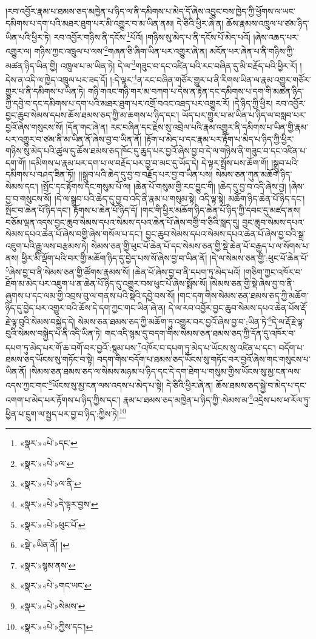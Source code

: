 །རབ་འབྱོར་རྣམ་པ་ཐམས་ཅད་མཁྱེན་པ་ཉིད་ལ་ནི་དམིགས་པ་མེད་དོ་ཞེས་འབྱུང་བས་ཁྱེད་ཀྱི་ཕྱོགས་ལ་ཡང་དམིགས་པ་དག་པའི་མཐར་ཐུག་པར་མི་འགྱུར་བ་མ་ཡིན་ནམ། དེ་ཅིའི་ཕྱིར་ཞེ་ན། ཆོས་རྣམས་འཁྲུལ་པ་ཙམ་ཉིད་ཡིན་པའི་ཕྱིར་ཏེ། རབ་འབྱོར་གཉིས་ནི་དངོས་\footnote{«སྣར་»«པེ་»དང་}པོའོ། །གཉིས་སུ་མེད་པ་ནི་དངོས་པོ་མེད་པའོ། །ཞེས་འཆད་པར་འགྱུར་ལ། གཉིས་ཀྱང་འཁྲུལ་པ་ལས་\footnote{«སྣར་»«པེ་»ལ་}གཞན་ཅི་ཞིག་ཡིན་པར་འགྱུར་ཞེ་ན། མངོན་པར་ཞེན་པ་ནི་གཉིས་ཀྱི་མཚན་ཉིད་ཡིན་གྱི། འཁྲུལ་པ་མ་ཡིན་ཏེ། དེ་ལ་\footnote{«སྣར་»«པེ་»ལ་ནི་}གཟུང་བ་དང་འཛིན་པའི་རང་བཞིན་དུ་མི་བརྗོད་པའི་ཕྱིར་རོ། །དེས་ན་འདི་ལ་ཁྱེད་འཁྲུལ་པར་ཟད་དོ། །:དེ་ལྟར་\footnote{«སྣར་»«པེ་»དེ་ལྟར་བྱས་}ན་རང་བཞིན་གཙོར་གྱུར་པ་ནི་རིགས་ཡིན་ལ་རྣམ་འགྱུར་གཙོར་གྱུར་པ་ནི་དམིགས་པ་ཡིན་ཏེ། གཉི་གའང་གཉི་གར་མ་བཀག་པ་དེས་ན་རྟེན་དང་དམིགས་པ་དག་གི་མཚན་ཉིད་ཀྱི་དབྱེ་བ་དང་དམིགས་པ་དག་པའི་མཐར་ཐུག་པར་འགྲོ་བའང་འཐད་པར་འགྱུར་རོ། །དེ་ཉིད་ཀྱི་ཕྱིར། རབ་འབྱོར་བྱང་ཆུབ་སེམས་དཔས་ཆོས་ཐམས་ཅད་ཀྱི་མ་ཆགས་པ་ཉིད་དང་། ཡོད་པར་གྱུར་པ་མ་ཡིན་པ་ཉིད་ལ་བསླབ་པར་བྱའོ་ཞེས་གསུངས་སོ། །དོན་གང་ཞེ་ན། རང་བཞིན་དང་རྗེས་སུ་འབྲེལ་པའི་རྣམ་འགྱུར་ནི་དམིགས་པ་ཡིན་གྱི་རྣམ་པར་འགྱུར་བ་ཙམ་ནི་མ་ཡིན་ནོ་ཞེས་བྱ་བ་ཡིན་ནོ། །རྟོག་པ་མེད་པ་དང་རྣམ་པར་རྟོག་པ་མེད་པ་ཉིད་ཀྱི་ཕྱིར་གཉིས་སུ་མེད་པའི་ཚུལ་དུ་ཆོས་ཐམས་ཅད་ཁོང་དུ་ཆུད་པར་བྱའོ་ཞེས་བྱ་བ་དེ་ལ་གཉིས་ནི་གཟུང་བ་དང་འཛིན་པ་དག་གོ། །དམིགས་པ་རྣམ་པར་དག་པ་ལ་བརྗོད་པར་བྱ་བ་མང་དུ་ཡོད་དེ། དེ་ལྟར་སྤྲོས་པས་ཆོག་གོ། །སྒྲུབ་པའི་དམིགས་པ་བཤད་ཟིན་ཏོ།། །།སྒྲུབ་པའི་ཆེད་དུ་བྱ་བ་བརྗོད་པར་བྱ་བ་ཡིན་པས། སེམས་ཅན་ཀུན་མཆོག་ཉིད་སེམས་དང་། །སྤོང་དང་རྟོགས་དང་གསུམ་པོ་ལ། །ཆེན་པོ་གསུམ་གྱི་རང་བྱུང་གི། །ཆེད་དུ་བྱ་བ་འདི་ཞེས་བྱ། །ཞེས་བྱ་བ་གསུངས་སོ། །དེ་ལ་སྒྲུབ་པའི་ཆེད་དུ་བྱ་བ་འདི་ནི་རྣམ་པ་གསུམ་སྟེ། འདི་ལྟ་སྟེ། མཆོག་ཉིད་ཆེན་པོ་ཉིད་དང་། སྤོང་བ་ཆེན་པོ་ཉིད་དང་། རྟོགས་པ་ཆེན་པོ་ཉིད་དོ། །གང་གི་ཕྱིར་མཆོག་ཉིད་ཆེན་པོ་ཉིད་ཀྱི་དབང་དུ་མཛད་ནས། བཅོམ་ལྡན་འདས་བྱང་ཆུབ་སེམས་དཔའ་སེམས་དཔའ་ཆེན་པོ་ཞེས་བགྱི་བ་ཅིའི་སླད་དུ། བྱང་ཆུབ་སེམས་དཔའ་སེམས་དཔའ་ཆེན་པོ་ཞེས་བགྱི་ཞེས་གསོལ་པ་དང་། བྱང་ཆུབ་སེམས་དཔའ་སེམས་དཔའ་ཆེན་པོ་ཞེས་བྱ་བའི་སྒྲ་འཇུག་པའི་རྒྱུ་ལས་བརྩམས་ཏེ། སེམས་ཅན་གྱི་ཕུང་པོ་ཆེན་པོ་དང་སེམས་ཅན་གྱི་སྡེ་ཆེན་པོ་བརྒྱད་པ་ལ་སོགས་པ་ནས། ཕྱིར་མི་ལྡོག་པའི་བར་གྱི་མཆོག་ཉིད་དུ་བྱེད་པས་སོ་ཞེས་བྱ་བ་ཡིན་ནོ། །དེ་ལ་སེམས་ཅན་གྱི་:ཕུང་པོ་ཆེན་པོ་\footnote{«སྣར་»«པེ་»ཕུང་པོ་}ཞེས་བྱ་བ་ནི་སེམས་ཅན་གྱི་ཚོགས་རྣམས་སོ། །ཆེན་པོ་ཞེས་བྱ་བ་ནི་དཔག་ཏུ་མེད་པའོ། །གཅིག་ཀྱང་འཁོར་བ་ཐོག་མ་མེད་པར་འཇུག་པ་ན་ཆེན་པོ་ཉིད་དུ་འགྱུར་བས་ཕུང་པོ་ཞེས་སྨོས་སོ། །སེམས་ཅན་གྱི་སྡེ་ཞེས་བྱ་བ་ནི་ཞུགས་པ་དང་ལམ་གྱི་འབྲས་བུ་ལ་གནས་པའི་སྡེའི་དབྱེ་བས་སོ། །གང་དག་གིས་སེམས་ཅན་ཐམས་ཅད་ཀྱི་མཆོག་ཉིད་དུ་བྱེད་པར་འགྱུར་བའི་ཆོས་དེ་དག་ཀྱང་གང་ཡིན་ཞེ་ན། དེ་ལ་རབ་འབྱོར་བྱང་ཆུབ་སེམས་དཔའ་ཆེན་པོས་རྡོ་རྗེ་ལྟ་བུའི་སེམས་བསྐྱེད་དེ། སེམས་ཅན་ཐམས་ཅད་ཀྱི་མཆོག་ཏུ་འགྱུར་བར་བྱའོ་ཞེས་བྱ་བ་:ཡིན་ཏེ་\footnote{«སྡེ་»ཡིན་ནོ། །}དེ་ལ་རྡོ་རྗེ་ལྟ་བུའི་སེམས་བསྐྱེད་པ་ནི་འདི་ཡིན་ཏེ། གང་འདི་སྙམ་དུ་བདག་གིས་སེམས་ཅན་ཐམས་ཅད་ཀྱི་དོན་དུ་འཁོར་བ་དཔག་ཏུ་མེད་པར་གོ་ཆ་བགོ་བར་བྱའོ་:སྙམ་པས་\footnote{«སྣར་»སྙམ་ནས་}འཁོར་བ་དཔག་ཏུ་མེད་པ་ཡོངས་སུ་འཛིན་པ་དང་། བདོག་པ་ཐམས་ཅད་ཡོངས་སུ་གཏོང་བ་སྟེ། བདག་གིས་བདོག་པ་ཐམས་ཅད་ཡོངས་སུ་གཏོང་བར་བྱའོ་ཞེས་གང་གསུངས་པ་ཡིན་ནོ། །སེམས་ཅན་ཐམས་ཅད་ལ་སེམས་མཉམ་པ་ཉིད་དང་དེ་དག་ཐེག་པ་གསུམ་གྱིས་ཡོངས་སུ་མྱ་ངན་ལས་འདས་ཀྱང་གང་\footnote{«སྣར་»«པེ་»གང་ཡང་}ཡོངས་སུ་མྱ་ངན་ལས་འདས་པ་མེད་པ་སྟེ། དེ་ཅིའི་ཕྱིར་ཞེ་ན། ཆོས་ཐམས་ཅད་སྐྱེ་བ་མེད་པ་དང་འགག་པ་མེད་པར་རྟོགས་པ་ཉིད་ཀྱིས་དང་། རྣམ་པ་ཐམས་ཅད་མཁྱེན་པ་ཉིད་ཀྱི་:སེམས་མ་\footnote{«སྣར་»«པེ་»སེམས་}འདྲེས་པས་ཕ་རོལ་ཏུ་ཕྱིན་པ་དྲུག་ལ་སྤྱད་པར་བྱ་བ་ཉིད་:ཀྱིས་ཏེ།\footnote{«སྣར་»«པེ་»ཀྱིས་དང་།} 